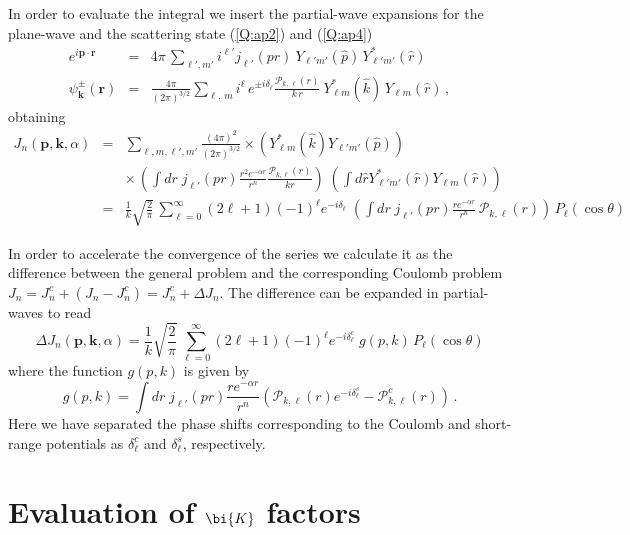 In order to evaluate the integral we insert the partial-wave expansions for the plane-wave and the scattering state (\ref{Q:ap2}) and (\ref{Q:ap4})
%
\begin{eqnarray*}
e^{i \bm{p} \cdot \bm{r}} &=& 4 \pi \, \sum_{\ell', m'} i^{\ell'}
j_{\ell'}(p r) \ Y_{\ell' m'}(\hat{p})\, Y^{*}_{\ell' m'}(\hat{r}) 
\\  
\psi^{\pm}_{\bm{k}}(\bm{r}) &=& \frac{4 \pi}{(2 \pi)^{3/2}}\sum_{\ell,\, m}
i^{\ell} \, e^{\pm i \delta_{\ell}} \frac{\mathcal{P}_{k,\,
\ell}(r)}{k\,r}\ Y^{*}_{\ell m}(\hat{k})\, Y_{\ell m}(\hat{r})\, ,
\end{eqnarray*}
%
obtaining
%
\begin{eqnarray*}
  J_{n}(\bm{p},\bm{k},\alpha) &=& \sum_{\ell, m, \ell', m'} \frac{(4 \pi)^{2}}{(2\pi)^{3/2}} \times \left(Y^{*}_{\ell m}(\hat{k}) Y_{\ell' m'}(\hat{p}) \right) \nonumber
\\
&&\times \, \left(\int d r \; j_{\ell'}(pr) \frac{r^{2} e^{-\alpha r}}{r^{n}} \frac{\mathcal{P}_{k,\ell}(r)}{kr} \right) \;  \left( \int d \hat{r} Y^{*}_{\ell' m'}(\hat{r})  Y_{\ell m}(\hat{r})\right) 
\\
&=& \frac{1}{k} \sqrt{\frac{2}{\pi}} \, \sum_{\ell=0}^{\infty} (2 \ell +1) (-1)^{\ell} e^{-i \delta_{\ell}} \; \left(\int  d r \; j_{\ell'}(pr) \frac{r e^{-\alpha r}}{r^{n}} \, \mathcal{P}_{k,\ell}(r) \right) \, P_{\ell}(\cos{\theta})
\end{eqnarray*}

In order to accelerate the convergence of the series we calculate it as the difference between the general problem and the corresponding Coulomb problem $J_{n}= J^{c}_{n} + (J_{n} - J^{c}_{n}) = J^{c}_{n} + \Delta{J_{n}}$. The difference can be expanded in partial-waves to read
\begin{equation}\label{eq:4}
  \Delta J_{n}(\bm{p},\bm{k},\alpha) = \frac{1}{k} \sqrt{\frac{2}{\pi}} \, \sum_{\ell=0}^{\infty} (2 \ell +1) (-1)^{\ell} e^{-i \delta^{c}_{\ell}} \; g(p,k)\, P_{\ell}(\cos{\theta})
\end{equation}
where the function $g(p,k)$ is given by
\[
g(p,k)= \int d r \; j_{\ell'}(pr) \frac{r e^{-\alpha r}}{r^{n}}\left( \mathcal{P}_{k ,\ell}(r)e^{-i \delta^{s}_{\ell}}  - \mathcal{P}^{c}_{k ,\ell}(r)\right)  \, .
\]
Here we have separated the phase shifts corresponding to the Coulomb and short-range potentials as $\delta^{c}_{\ell}$ and $\delta^{s}_{\ell}$, respectively.





\section{Evaluation of $\bi{K}$ factors}

